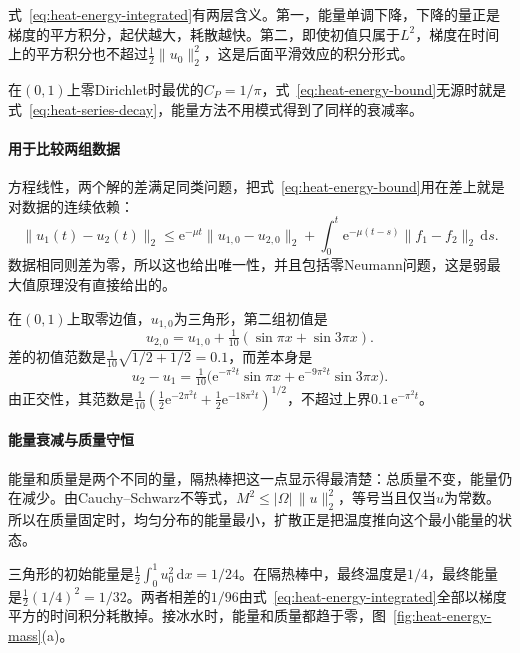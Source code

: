 式~\eqref{eq:heat-energy-integrated}有两层含义。第一，能量单调下降，下降的量正是梯度的平方积分，起伏越大，耗散越快。第二，即使初值只属于$L^2$，梯度在时间上的平方积分也不超过$\tfrac12\lVert u_0\rVert_2^2$，这是后面平滑效应的积分形式。

在$(0,1)$上零Dirichlet时最优的$C_P=1/\pi$，式~\eqref{eq:heat-energy-bound}无源时就是式~\eqref{eq:heat-series-decay}，能量方法不用模式得到了同样的衰减率。

\paragraph{用于比较两组数据}
方程线性，两个解的差满足同类问题，把式~\eqref{eq:heat-energy-bound}用在差上就是对数据的连续依赖：
\begin{equation}
 \lVert u_1(t)-u_2(t)\rVert_2\leq\mathrm{e}^{-\mu t}\lVert u_{1,0}-u_{2,0}\rVert_2+\int_0^t\mathrm{e}^{-\mu(t-s)}\lVert f_1-f_2\rVert_2\,\mathrm{d}s .
 \label{eq:heat-energy-stability}
\end{equation}
数据相同则差为零，所以这也给出唯一性，并且包括零Neumann问题，这是弱最大值原理没有直接给出的。

\begin{example}[两组初值的差]
\label{ex:heat-energy-difference}
在$(0,1)$上取零边值，$u_{1,0}$为三角形，第二组初值是
\[
 u_{2,0}=u_{1,0}+\tfrac{1}{10}(\sin\pi x+\sin3\pi x) .
\]
差的初值范数是$\tfrac{1}{10}\sqrt{1/2+1/2}=0.1$，而差本身是
\[
 u_2-u_1=\tfrac{1}{10}\bigl(\mathrm{e}^{-\pi^2t}\sin\pi x+\mathrm{e}^{-9\pi^2t}\sin3\pi x\bigr) .
\]
由正交性，其范数是$\tfrac{1}{10}(\tfrac12\mathrm{e}^{-2\pi^2t}+\tfrac12\mathrm{e}^{-18\pi^2t})^{1/2}$，不超过上界$0.1\,\mathrm{e}^{-\pi^2t}$。
\end{example}

\paragraph{能量衰减与质量守恒}
能量和质量是两个不同的量，隔热棒把这一点显示得最清楚：总质量不变，能量仍在减少。由Cauchy--Schwarz不等式，$M^2\leq\lvert\Omega\rvert\,\lVert u\rVert_2^2$，等号当且仅当$u$为常数。所以在质量固定时，均匀分布的能量最小，扩散正是把温度推向这个最小能量的状态。

三角形的初始能量是$\tfrac12\int_0^1u_0^2\,\mathrm{d}x=1/24$。在隔热棒中，最终温度是$1/4$，最终能量是$\tfrac12(1/4)^2=1/32$。两者相差的$1/96$由式~\eqref{eq:heat-energy-integrated}全部以梯度平方的时间积分耗散掉。接冰水时，能量和质量都趋于零，图~\ref{fig:heat-energy-mass}(a)。

